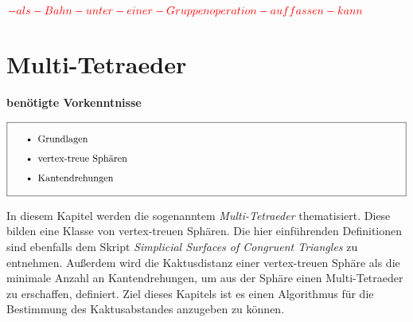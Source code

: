 \documentclass[12pt,titlepage,twoside,cleardoublepage]{article}
\theoremstyle{nummermitklammern}
\numberwithin{equation}{section}
\begin{document}
$\textcolor{red}{-als-Bahn-unter- einer- Gruppenoperation-auffassen- kann}$
\section{Multi-Tetraeder}\label{kapitelmultitetraeder}
\textbf{benötigte Vorkenntnisse} 
\begin{center}
$\fbox{
\parbox{14cm}{\begin{itemize}
\item Grundlagen
\item vertex-treue Sph\"aren
\item Kantendrehungen 
\end{itemize}
}}$
\end{center}

In diesem Kapitel werden die sogenanntem \emph{Multi-Tetraeder} thematisiert. Diese bilden eine Klasse von vertex-treuen Sphären. Die hier einführenden Definitionen sind ebenfalls dem Skript \emph{Simplicial Surfaces of Congruent Triangles} zu entnehmen. Außerdem wird die Kaktusdistanz einer vertex-treuen Sphäre als die minimale Anzahl an Kantendrehungen, um aus der Sphäre einen Multi-Tetraeder zu erschaffen, definiert. Ziel dieses Kapitels ist es einen Algorithmus für die Bestimmung des Kaktusabstandes anzugeben zu können. \\\\
\end{document}
